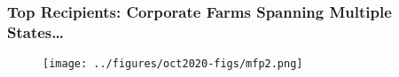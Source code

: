 \documentclass[9pt,pdftex,aspectratio=1610]{beamer}
\theoremstyle{definition}
\begin{document}
\begin{frame}[t]
\frametitle{Top Recipients: Corporate Farms Spanning Multiple States\ldots}
\begin{figure}[t]
\centerline{\texttt{[image: ../figures/oct2020-figs/mfp2.png]}}
\end{figure}
\end{frame}





\setcounter{framenumber}{\value{finalframe}}

\end{document}
